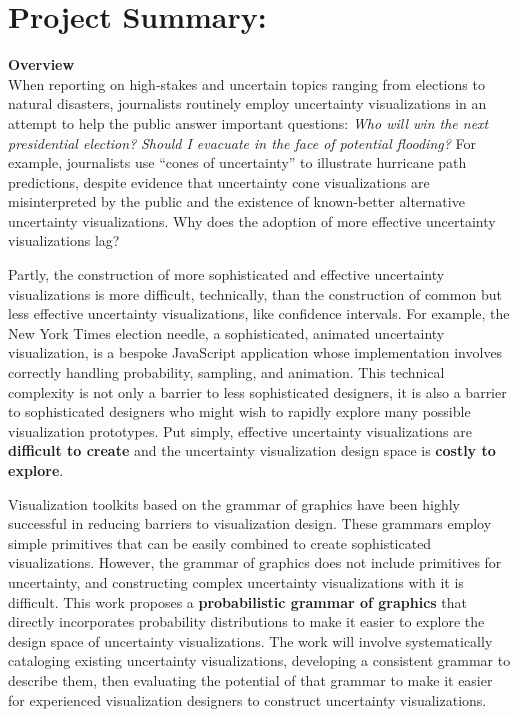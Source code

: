 \documentclass[11pt]{article}
\begin{document}
\section*{Project Summary: \mytitle}
\setcounter{section}{1}

\noindent\textbf{Overview}\\
When reporting on high-stakes and uncertain topics ranging from elections to natural disasters, journalists routinely employ uncertainty visualizations in an attempt to help the public answer important questions: \emph{Who will win the next presidential election?} \emph{Should I evacuate in the face of potential flooding?} For example, journalists use ``cones of uncertainty'' to illustrate hurricane path predictions, despite evidence that uncertainty cone visualizations are misinterpreted by the public and the existence of known-better alternative uncertainty visualizations. Why does the adoption of more effective uncertainty visualizations lag? 

Partly, the construction of more sophisticated and effective uncertainty visualizations is more difficult, technically, than the construction of common but less effective uncertainty visualizations, like confidence intervals. For example, the New York Times election needle, a sophisticated, animated uncertainty visualization, is a bespoke JavaScript application whose implementation involves correctly handling probability, sampling, and animation. This technical complexity is not only a barrier to less sophisticated designers, it is also a barrier to sophisticated designers who might wish to rapidly explore many possible visualization prototypes. Put simply, effective uncertainty visualizations are \textbf{difficult to create} and the uncertainty visualization design space is \textbf{costly to explore}.

Visualization toolkits based on the grammar of graphics have been highly successful in reducing barriers to visualization design. These grammars employ simple primitives that can be easily combined to create sophisticated visualizations. However, the grammar of graphics does not include primitives for uncertainty, and constructing complex uncertainty visualizations with it is difficult. This work proposes a \textbf{probabilistic grammar of graphics} that directly incorporates probability distributions to make it easier to explore the design space of uncertainty visualizations. The work will involve systematically cataloging existing uncertainty visualizations, developing a consistent grammar to describe them, then evaluating the potential of that grammar to make it easier for experienced visualization designers to construct uncertainty visualizations.
\end{document}
